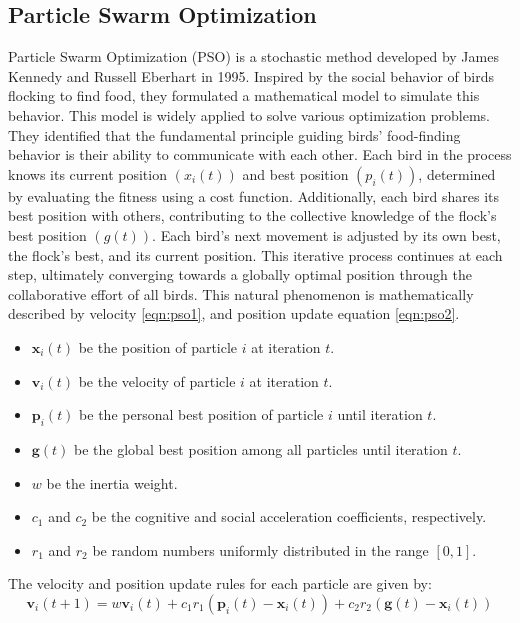 \documentclass[paper,revised]{geophysics}
\begin{document}
\subsection{Particle Swarm Optimization}
Particle Swarm Optimization (PSO) is a stochastic method developed by James Kennedy and Russell Eberhart in 1995. Inspired by the social behavior of birds flocking to find food, they formulated a mathematical model to simulate this behavior. This model is widely applied to solve various optimization problems. They identified that the fundamental principle guiding birds' food-finding behavior is their ability to communicate with each other. Each bird in the process knows its current position \((x_i(t))\) and best position \((p_i(t))\), determined by evaluating the fitness using a cost function. Additionally, each bird shares its best position with others, contributing to the collective knowledge of the flock's best position \((g(t))\). Each bird's next movement is adjusted by its own best, the flock's best, and its current position. This iterative process continues at each step, ultimately converging towards a globally optimal position through the collaborative effort of all birds. This natural phenomenon is mathematically described by velocity \ref{eqn:pso1}, and position update equation \ref{eqn:pso2}.
\begin{itemize}
	\item \( \mathbf{x}_i(t) \) be the position of particle \( i \) at iteration \( t \).
	\item \( \mathbf{v}_i(t) \) be the velocity of particle \( i \) at iteration \( t \).
	\item \( \mathbf{p}_i(t) \) be the personal best position of particle \( i \) until iteration \( t \).
	\item \( \mathbf{g}(t) \) be the global best position among all particles until iteration \( t \).
	\item \( w \) be the inertia weight.
	\item \( c_1 \) and \( c_2 \) be the cognitive and social acceleration coefficients, respectively.
	\item \( r_1 \) and \( r_2 \) be random numbers uniformly distributed in the range \([0, 1]\).
\end{itemize}

The velocity and position update rules for each particle are given by:
\begin{equation}
	\label{eqn:pso1}
	\mathbf{v}_i(t+1) = w \mathbf{v}_i(t) + c_1 r_1 (\mathbf{p}_i(t) - \mathbf{x}_i(t)) + c_2 r_2 (\mathbf{g}(t) - \mathbf{x}_i(t))	
\end{equation}
\end{document}
